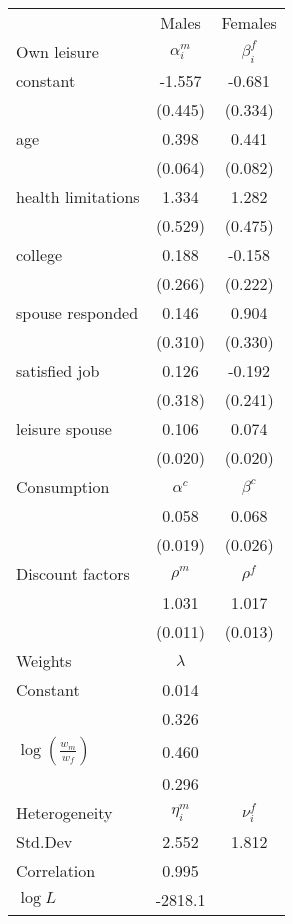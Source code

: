 \begin{tabular}{lcc} 
\hline\hline 
 & Males & Females \\ 
Own leisure & $\alpha_{i}^{m}$ & $\beta_{i}^{f}$ \\ 
constant & -1.557 & -0.681 \\ 
 & (0.445) & (0.334) \\ 
age & 0.398 & 0.441 \\ 
 & (0.064) & (0.082) \\ 
health limitations & 1.334 & 1.282 \\ 
 & (0.529) & (0.475) \\ 
college & 0.188 & -0.158 \\ 
 & (0.266) & (0.222) \\ 
spouse responded & 0.146 & 0.904 \\ 
 & (0.310) & (0.330) \\ 
satisfied job & 0.126 & -0.192 \\ 
 & (0.318) & (0.241) \\ 
leisure spouse & 0.106 & 0.074 \\ 
 & (0.020) & (0.020) \\ 
Consumption & $\alpha^{c}$ & $\beta^{c}$ \\ 
 & 0.058 & 0.068 \\ 
 & (0.019) & (0.026) \\ 
Discount factors & $\rho^m$ & $\rho^f$ \\ 
 & 1.031 & 1.017 \\ 
 & (0.011) & (0.013) \\ 
Weights & $\lambda$ &  \\ 
Constant & 0.014 &  \\ 
 & 0.326 &  \\ 
$\log(\frac{w_m}{w_f})$ & 0.460 &  \\ 
 & 0.296 &  \\ 
Heterogeneity & $\eta_i^m$ & $\nu_i^f$ \\ 
Std.Dev & 2.552 & 1.812 \\ 
Correlation & 0.995 &  \\ 
\hline 
$\log L$ & -2818.1 & \\ 
\hline \hline 
\end{tabular} 
